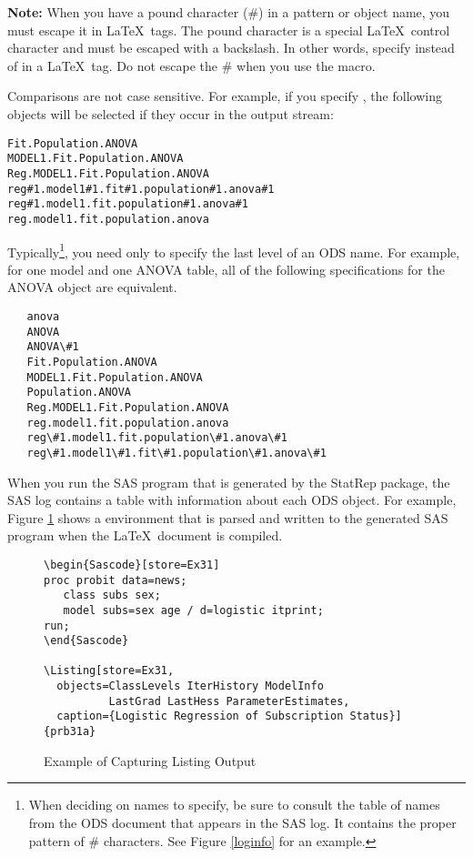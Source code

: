 \documentclass[article,oneside]{memoir}
\newcommand*{\StatRep}{\textsf{StatRep}\xspace}
\begin{document}
  \textbf{Note:} When you have a pound character (\#) in a pattern or object name, 
  you must escape it in \LaTeX\ tags. The pound character is a special \LaTeX\ control 
  character and must be escaped with a backslash. 
  In other words, specify  instead of 
   in a \LaTeX\ tag.
  Do not escape the \# when you use the  macro.
  
  Comparisons are not case sensitive. For example, if you specify , 
  the following objects will be selected if they occur in the output stream:
\begin{snugshade}
\begin{verbatim} 
Fit.Population.ANOVA
MODEL1.Fit.Population.ANOVA
Reg.MODEL1.Fit.Population.ANOVA
reg#1.model1#1.fit#1.population#1.anova#1
reg#1.model1.fit.population#1.anova#1
reg.model1.fit.population.anova
\end{verbatim}
\end{snugshade}
  
  Typically\footnote{When deciding on names to specify, be sure to consult the table of names 
  from the ODS document that appears in the SAS log. It contains the proper pattern 
  of \# characters. See Figure \ref{loginfo} for an example.}, 
  you need only to specify the last level of an ODS name.
  For example, for one model and one ANOVA table, 
  all of the following specifications for the ANOVA object are equivalent.

\begin{snugshade}
\begin{verbatim}
   anova
   ANOVA
   ANOVA\#1
   Fit.Population.ANOVA
   MODEL1.Fit.Population.ANOVA
   Population.ANOVA
   Reg.MODEL1.Fit.Population.ANOVA
   reg.model1.fit.population.anova
   reg\#1.model1.fit.population\#1.anova\#1
   reg\#1.model1\#1.fit\#1.population\#1.anova\#1
\end{verbatim}
\end{snugshade}

  When you run the SAS program that is generated by the \StatRep package, 
  the SAS log contains a table with information about each ODS object. 
  For example, Figure \ref{capturelist} shows a  environment that
  is parsed and written to the generated SAS program when the \LaTeX\ document
  is compiled.
\begin{figure}[H]
\begin{snugshade}
\begin{verbatim}
\begin{Sascode}[store=Ex31]
proc probit data=news;
   class subs sex;
   model subs=sex age / d=logistic itprint;
run;
\end{Sascode}

\Listing[store=Ex31,
  objects=ClassLevels IterHistory ModelInfo 
          LastGrad LastHess ParameterEstimates,
  caption={Logistic Regression of Subscription Status}]{prb31a}

\end{verbatim}
\end{snugshade}
\caption{Example of Capturing Listing Output}\label{capturelist}
\end{figure}
  
\end{document}
